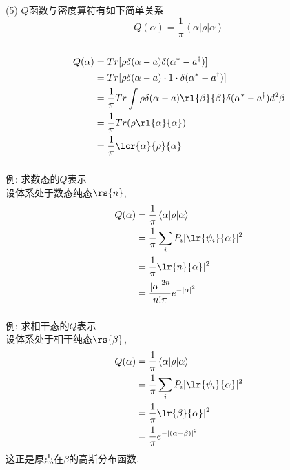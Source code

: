   \begin{frame} 
  \frametitle{}
     (5) $Q$函数与密度算符有如下简单关系
  \[ Q(\alpha) = \frac{1}{\pi} \left\langle \alpha |\rho|\alpha \right\rangle \]
  ~ \证 
  \[ \begin{aligned}
    Q(\alpha) &= Tr[\rho \delta(\alpha-a)\delta(\alpha^*-a^{\dagger})]\\
    &= Tr[\rho \delta(\alpha-a)\cdot 1 \cdot\delta(\alpha^*-a^{\dagger})]\\
    &= \frac{1}{\pi} Tr \int \rho \delta(\alpha-a) \rl{\beta}{\beta}\delta(\alpha^*-a^{\dagger}) d^2 \beta\\ 
    &= \frac{1}{\pi} Tr( \rho \rl{\alpha}{\alpha} )  \\
    &= \frac{1}{\pi} \lcr{\alpha}{\rho}{\alpha}
  \end{aligned}\] 
  \end{frame}

  \begin{frame} 
  \frametitle{}
    例: 求数态的$Q$表示 \\ 
    \解 设体系处于数态纯态$\rs{n}$, 
    \[ \begin{aligned}
      Q(\alpha)  &= \frac{1}{\pi} \left\langle \alpha|\rho | \alpha \right\rangle  \\
      &= \frac{1}{\pi} \sum_i P_i |\lr{\psi_i}{\alpha}|^2 \\ 
      &= \frac{1}{\pi}\lr{n}{\alpha}|^2 \\ 
      &= \frac{\left|\alpha\right|^{2n}}{n!\pi} e^{-\left|\alpha\right|^2} 
      \end{aligned}\] 
  \end{frame}

  \begin{frame} 
    \frametitle{}
      例: 求相干态的$Q$表示 \\ 
      \解 设体系处于相干纯态$\rs{\beta}$, 
      \[ \begin{aligned}
        Q(\alpha)  &= \frac{1}{\pi} \left\langle \alpha|\rho | \alpha \right\rangle  \\
        &= \frac{1}{\pi} \sum_i P_i |\lr{\psi_i}{\alpha}|^2 \\ 
        &= \frac{1}{\pi}\lr{\beta}{\alpha}|^2 \\ 
        &= \frac{1}{\pi} e^{-\left|(\alpha-\beta)\right|^2}
        \end{aligned}\] 
        这正是原点在$\beta$的高斯分布函数.
    \end{frame}

